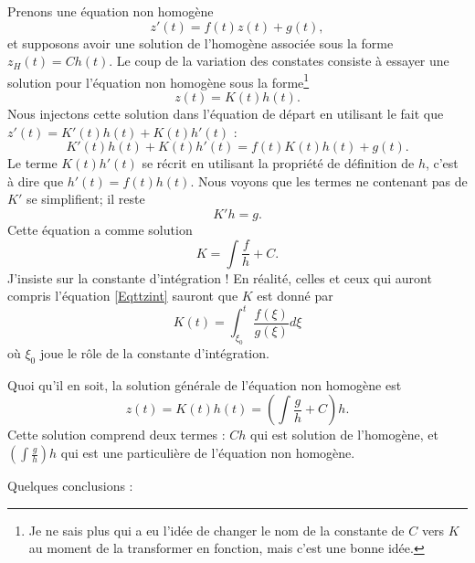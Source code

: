 Prenons une équation non homogène 
\begin{equation}        \label{EqAstNNHomo}
    z'(t)=f(t)z(t)+g(t),
\end{equation}
et supposons avoir une solution de l'homogène associée sous la forme $z_H(t)=Ch(t)$. Le coup de la variation des constates consiste à essayer une solution pour l'équation non homogène sous la forme\footnote{Je ne sais plus qui a eu l'idée de changer le nom de la constante de $C$ vers $K$ au moment de la transformer en fonction, mais c'est une bonne idée.}
\begin{equation}
    z(t)=K(t)h(t).
\end{equation}
Nous injectons cette solution dans l'équation de départ en utilisant le fait que $z'(t)=K'(t)h(t)+K(t)h'(t)$ :
\begin{equation}
    K'(t)h(t)+K(t)h'(t)=f(t)K(t)h(t)+g(t).
\end{equation}
Le terme $K(t)h'(t)$ se récrit en utilisant la propriété de définition de $h$, c'est à dire que $h'(t)=f(t)h(t)$. Nous voyons que les termes ne contenant pas de $K'$ se simplifient; il reste
\begin{equation}
    K'h=g.
\end{equation}
Cette équation a comme solution
\begin{equation}
    K=\int \frac{ f }{ h }+C.
\end{equation}
J'insiste sur la constante d'intégration ! En réalité, celles et ceux qui auront compris l'équation \eqref{Eqttzint} sauront que $K$ est donné par
\begin{equation}
    K(t)=\int_{\xi_0}^{t}\frac{ f(\xi) }{ g(\xi) }d\xi
\end{equation}
où $\xi_0$ joue le rôle de la constante d'intégration.

Quoi qu'il en soit, la solution générale de l'équation non homogène est
\begin{equation}        \label{EqSolVarCosntCool}
    z(t)=K(t)h(t)=\left( \int\frac{ g }{ h }+C \right)h.
\end{equation}
Cette solution comprend deux termes : $Ch$ qui est solution de l'homogène, et $\left( \int \frac{ g }{ h } \right)h$ qui est une particulière de l'équation non homogène.

Quelques conclusions :

